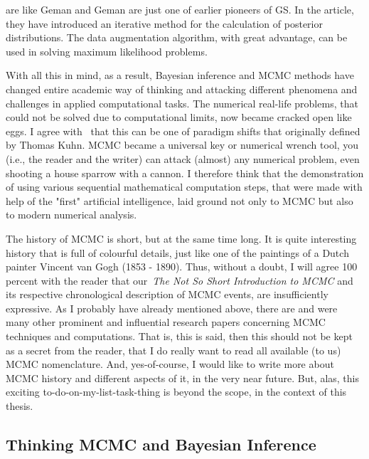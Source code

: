 \documentclass[a4paper,11pt,english]{article}
\begin{document}
		\citep{tanner} are like Geman and Geman are just one of earlier pioneers of GS. In the article, they have introduced an iterative method for 
		the calculation of posterior distributions. The data augmentation algorithm, with great advantage, can be used in solving maximum likelihood 
		problems.		 
		 			
		With all this in mind, as a result, Bayesian inference and MCMC methods have changed entire academic way of thinking and attacking different 
		phenomena and challenges in applied computational tasks. The numerical real-life problems, that could not be solved due to computational limits, 
		now became cracked open like eggs. I agree with~\citep{robert} that this can be one of paradigm shifts that originally defined by Thomas Kuhn. 			MCMC became a universal key or numerical wrench tool, you (i.e., the reader and the writer) can attack (almost) any numerical problem, even 
		shooting a house sparrow with a cannon. I therefore think that the demonstration of using various sequential mathematical computation steps, that 
		were made with help of the "first" artificial intelligence, laid ground not only to MCMC but also to modern numerical analysis.	

		The history of MCMC is short, but at the same time long. It is quite interesting history that is full of colourful details, just like one of the 
		paintings of a Dutch painter Vincent van Gogh (1853 - 1890). Thus, without a doubt, I will agree 100 percent with the reader that our~\textit{The 
		Not So Short Introduction to MCMC} and its respective chronological description of MCMC events, are insufficiently expressive. As I probably have 
		already mentioned above, there are and were many other prominent and influential research papers concerning MCMC techniques and computations. That 
		is, this is said, then this  should not be kept as a secret from the reader, that I do really want to read all available (to us) MCMC 
		nomenclature. And, yes-of-course, I would like to write more about MCMC history and different aspects of it, in the very near future. But, alas, 
		this exciting to-do-on-my-list-task-thing is beyond the scope, in the context of this thesis. 
		

		\subsection{Thinking MCMC and Bayesian Inference} 
		
\end{document}
